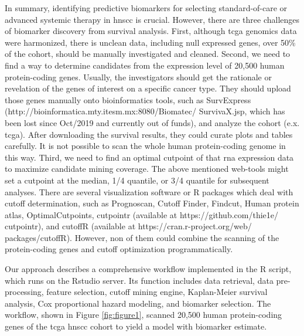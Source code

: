 \documentclass[jpm,article,submit,moreauthors,pdftex]{Definitions/mdpi}
\begin{document}
\par
In summary, identifying predictive biomarkers for selecting standard-of-care or advanced systemic therapy\cite{Cristina2019} in \acrshort{hnscc} is crucial. 
However, there are three challenges of biomarker discovery from survival analysis.
First, although \acrshort{tcga} genomics data were harmonized, there is unclean data, including null expressed genes, over 50\% of the cohort, should be manually investigated and cleaned.
Second, we need to find a way to determine candidates from the expression level of 20,500 human protein-coding genes\cite{Clamp2007}. Usually, the investigators should get the rationale or revelation of the genes of interest on a specific cancer type. They should upload those genes manually onto bioinformatics tools, such as SurvExpress (http://bioinformatica.mty.itesm.mx:8080/Biomatec/ \newline
SurvivaX.jsp\cite{Aguirre-Gamboa2013}, which has been lost since Oct/2019 and currently out of funds), and analyze the cohort (e.x. \acrshort{tcga}). After downloading the survival results, they could curate plots and tables carefully.
It is not possible to scan the whole human protein-coding genome in this way.
Third, we need to find an optimal cutpoint of that \acrshort{rna} expression data to maximize candidate mining coverage. The above mentioned web-tools might set a cutpoint at the median, 1/4 quantile, or 3/4 quantile for subsequent analyses. There are several visualization software or R packages which deal with cutoff determination, such as Prognoscan\cite{Mizuno2009a}, Cutoff Finder\cite{Budczies2012}, Findcut\cite{Chang2017a}, Human protein atlas\cite{Uhlen2017}, OptimalCutpoints\cite{Cristina2019},  cutpointr (available at https://github.com/thie1e/ \newline
cutpointr), and cutoffR (available at https://cran.r-project.org/web/
packages/cutoffR). However, non of them could combine the scanning of the protein-coding genes and cutoff optimization programmatically.

Our approach describes a comprehensive workflow implemented in the R script, which runs on the Rstudio server.
Its function includes data retrieval, data pre-processing, feature selection, cutoff mining engine, Kaplan-Meier survival analysis, Cox proportional hazard modeling, and biomarker selection.
The workflow, shown in Figure \ref{fig:figure1}, scanned 20,500 human protein-coding genes of the \acrshort{tcga} \acrshort{hnscc} cohort to yield a model with biomarker estimate.
\end{document}

